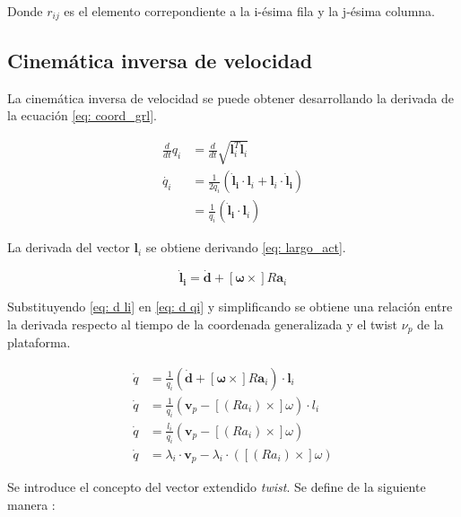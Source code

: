 Donde $r_{ij}$ es el elemento correpondiente
a la i-ésima fila y la j-ésima columna.

\subsection{Cinemática inversa de velocidad}
La cinemática inversa de velocidad se puede 
obtener desarrollando la derivada de 
la ecuación \eqref{eq: coord_grl}.

\begin{equation} \label{eq: d qi}
\begin{split}
\frac{d}{dt}q_i & = \frac{d}{dt}\sqrt{\mathbf l_i^T  \mathbf l_i}  \\
\dot{q_i} & = \frac{1}{2q_i} (\mathbf{\dot l_i} \cdot \mathbf l_i + \mathbf l_i \cdot \mathbf{\dot l_i})\\
 &= \frac{1}{q_i} (\mathbf{\dot l_i} \cdot \mathbf l_i)
\end{split}
\end{equation}

La derivada del vector $\mathbf l_i$ se obtiene derivando
\eqref{eq: largo_act}.

\begin{equation}\label{eq: d li}
 \mathbf{\dot l_i} = \mathbf{\dot d} + [\boldsymbol \omega \times] R\mathbf a_i
\end{equation}

Substituyendo \eqref{eq: d li} en \eqref{eq: d qi} y 
simplificando se obtiene una relación entre
la derivada respecto al tiempo de la coordenada generalizada 
y el twist  $\nu_p$ de la plataforma.

\begin{equation}\label{eq: d q def}
 \begin{split}
    \dot q  & =\frac{1}{q_i}(\mathbf{\dot{d}} + [\boldsymbol \omega \times] R \mathbf a_i)\cdot \mathbf l_i   \\
    \dot q        & = \frac{1}{q_i}(\mathbf v_p - [(Ra_i)\times]\omega)\cdot l_i\\
    \dot q        & = \frac{l_i}{q_i}\left( \mathbf v_p - [(Ra_i)\times]\omega \right) \\
    \dot q        & =  \lambda_i \cdot \mathbf v_p - \lambda_i \cdot ([(Ra_i)\times] \omega)
 \end{split}
\end{equation}

Se introduce el concepto del vector extendido \emph{twist}. 
Se define de la siguiente manera \cite{olguin20183d}:

